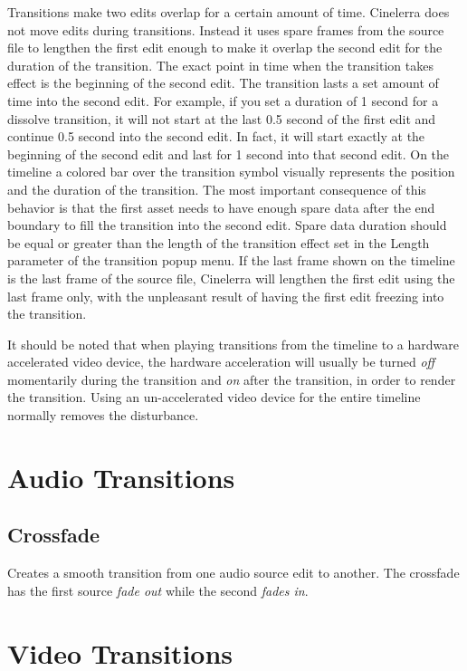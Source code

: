 Transitions make two edits overlap for a certain amount of time. Cinelerra does not move edits during transitions. Instead it uses spare frames from the source file to lengthen the first edit enough to make it overlap the second edit for the duration of the transition. The exact point in time when the transition takes effect is the beginning of the second edit. The transition lasts a set amount of time into the second edit. For example, if you set a duration of 1 second for a dissolve transition, it will not start at the last 0.5 second of the first edit and continue 0.5 second into the second edit. In fact, it will start exactly at the beginning of the second edit and last for 1 second into that second edit. On the timeline a colored bar over the transition symbol visually represents the position and the duration of the transition.
The most important consequence of this behavior is that the first asset needs to have enough spare data after the end boundary to fill the transition into the second edit. Spare data duration should be equal or greater than the length of the transition effect set in the Length parameter of the transition popup menu.
If the last frame shown on the timeline is the last frame of the source file, Cinelerra will lengthen the first edit using the last frame only, with the unpleasant result of having the first edit freezing into the transition.

It should be noted that when playing transitions from the timeline to a hardware accelerated video device, the hardware acceleration will usually be turned \textit{off} momentarily during the transition and \textit{on} after the transition, in order to render the transition. Using an un-accelerated video device for the entire timeline normally removes the disturbance.

\section{Audio Transitions}%
\label{sec:audio_transition}

\subsection*{Crossfade}%
\label{sub:crossfade}

Creates a smooth transition from one audio source edit to another. The crossfade has the first source \textit{fade out} while the second \textit{fades in}.

\section{Video Transitions}%
\label{sec:video_transition}

